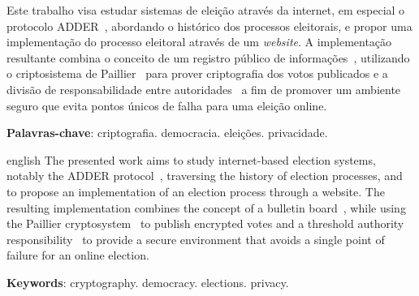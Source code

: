 \begin{resumo}
    Este trabalho visa estudar sistemas de eleição através da internet, em
    especial o protocolo ADDER~\cite{kiayias2006internet}, abordando o
    histórico dos processos eleitorais, e propor uma implementação do processo
    eleitoral através de um \textit{website}. A implementação resultante
    combina o conceito de um registro público de
    informações~\cite{benaloh1987verifiable}, utilizando o criptosistema de
    Paillier~\cite{paillier1999public} para prover criptografia dos votos
    publicados e a divisão de responsabilidade entre
    autoridades~\cite{fouque2000sharing} a fim de promover um ambiente seguro
    que evita pontos únicos de falha para uma eleição online.

    \textbf{Palavras-chave}: criptografia. democracia. eleições. privacidade.
\end{resumo}

\begin{resumo}[Abstract]
    \begin{otherlanguage*}{english}
        The presented work aims to study internet-based election systems,
        notably the ADDER protocol~\cite{kiayias2006internet}, traversing the
        history of election processes, and to propose an implementation of an
        election process through a website. The resulting implementation
        combines the concept of a bulletin board~\cite{benaloh1987verifiable},
        while using the Paillier cryptosystem~\cite{paillier1999public} to
        publish encrypted votes and a threshold authority
        responsibility~\cite{fouque2000sharing} to provide a secure environment
        that avoids a single point of failure for an online election.

        \textbf{Keywords}: cryptography. democracy. elections. privacy.
    \end{otherlanguage*}
\end{resumo}
